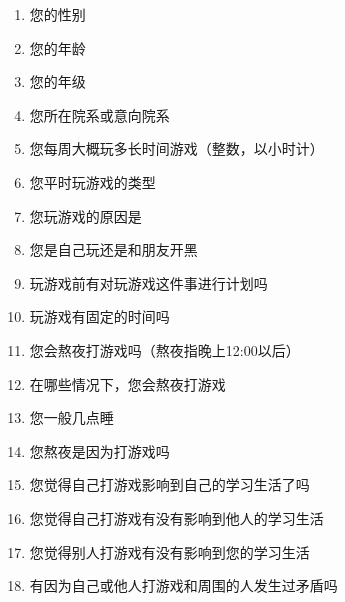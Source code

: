 \documentclass[scheme=plain]{ctexart}
\begin{document}
\begin{tcolorbox}
    \begin{multicols}{2}
        \begin{enumerate}
            \item 您的性别
            \item 您的年龄
            \item 您的年级
            \item 您所在院系或意向院系
            \item 您每周大概玩多长时间游戏（整数，以小时计）
            \item 您平时玩游戏的类型
            \item 您玩游戏的原因是
            \item 您是自己玩还是和朋友开黑
            \item 玩游戏前有对玩游戏这件事进行计划吗
            \item 玩游戏有固定的时间吗
            \item 您会熬夜打游戏吗（熬夜指晚上12:00以后）
            \item 在哪些情况下，您会熬夜打游戏
            \item 您一般几点睡
            \item 您熬夜是因为打游戏吗
            \item 您觉得自己打游戏影响到自己的学习生活了吗
            \item 您觉得自己打游戏有没有影响到他人的学习生活
            \item 您觉得别人打游戏有没有影响到您的学习生活
            \item 有因为自己或他人打游戏和周围的人发生过矛盾吗
        \end{enumerate}
    \end{multicols}
\end{tcolorbox}
\end{document}
